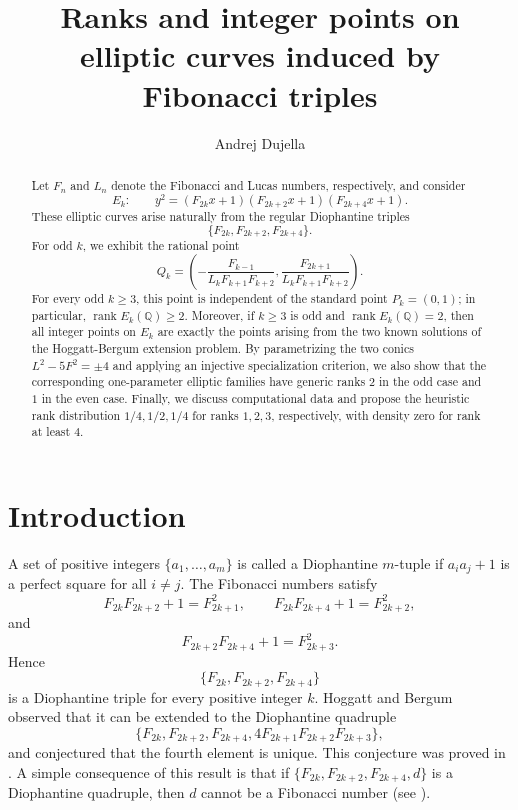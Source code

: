 \documentclass[11pt]{amsart}
\title[Elliptic curves induced by Fibonacci triples]{Ranks and integer points on elliptic curves induced by Fibonacci triples}
\author{Andrej Dujella}
\date{}
\theoremstyle{remark}
\newcommand{\Q}{\mathbb{Q}}
\begin{document}

\begin{abstract}
Let $F_n$ and $L_n$ denote the Fibonacci and Lucas numbers, respectively, and consider
\[
 E_k:\qquad y^2=(F_{2k}x+1)(F_{2k+2}x+1)(F_{2k+4}x+1).
\]
These elliptic curves arise naturally from the regular Diophantine triples
\[
 \{F_{2k},F_{2k+2},F_{2k+4}\}.
\]
For odd $k$, we exhibit the rational point
\[
 Q_k=\left(
 -\frac{F_{k-1}}{L_kF_{k+1}F_{k+2}},
 \frac{F_{2k+1}}{L_kF_{k+1}F_{k+2}}
 \right).
\]
For every odd $k\geq 3$, this point is independent of the standard point
$P_k=(0,1)$; in particular, $\operatorname{rank}E_k(\Q)\geq 2$.
Moreover, if $k\geq 3$ is odd and $\operatorname{rank}E_k(\Q)=2$, then all
integer points on $E_k$ are exactly the points arising from the two known
solutions of the Hoggatt-Bergum extension problem.  By parametrizing the
two conics $L^2-5F^2=\pm4$ and applying an injective specialization
criterion, we also show that the corresponding one-parameter elliptic
families have generic ranks $2$ in the odd case and $1$ in the even case.
Finally, we discuss computational data and propose the heuristic rank
distribution $1/4,1/2,1/4$ for ranks $1,2,3$, respectively, with density
zero for rank at least $4$.
\end{abstract}

\maketitle

\section{Introduction}

A set of positive integers $\{a_1,\ldots,a_m\}$ is called a Diophantine
$m$-tuple if $a_i a_j+1$ is a perfect square for all $i\neq j$.
The Fibonacci numbers satisfy
\[
 F_{2k}F_{2k+2}+1=F_{2k+1}^2,\qquad
 F_{2k}F_{2k+4}+1=F_{2k+2}^2,
\]
and
\[
 F_{2k+2}F_{2k+4}+1=F_{2k+3}^2.
\]
Hence
\[
 \{F_{2k},F_{2k+2},F_{2k+4}\}
\]
is a Diophantine triple for every positive integer $k$.  Hoggatt and
Bergum~\cite{HoggattBergum} observed that it can be extended to the Diophantine quadruple
\[
 \{F_{2k},F_{2k+2},F_{2k+4},
 4F_{2k+1}F_{2k+2}F_{2k+3}\},
\]
and conjectured that the fourth element is unique.  This conjecture was
proved in \cite{DujellaHB}. A simple consequence of this result is that 
if $\{F_{2k}, F_{2k+2}, F_{2k+4}, d\}$ is a Diophantine quadruple, then $d$ cannot be a Fibonacci number 
(see \cite[Section 4.9.1]{DujellaBook}). 
\end{document}
